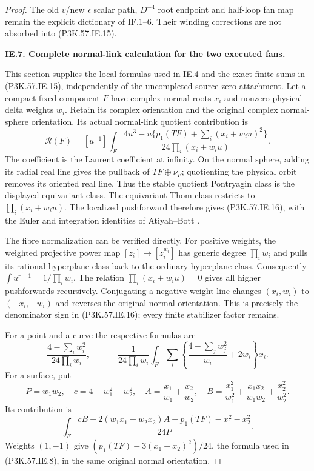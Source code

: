 \begin{proof}
The old
\(v\)/new \(\epsilon\) scalar path,
\(D^{-4}\) root endpoint and
half-loop fan map remain the explicit
dictionary of IF.1--6. Their winding
corrections are not absorbed into
(P3K.57.IE.15).

\par\medskip\noindent\textbf{IE.7. Complete normal-link calculation for the two executed fans.}\par\nopagebreak[4]

This section supplies the local formulas used in IE.4 and
the exact finite sums in (P3K.57.IE.15), independently of the
uncompleted source-zero attachment. Let a compact fixed
component \(F\) have complex normal roots \(x_i\) and
nonzero physical delta weights \(w_i\). Retain its complex
orientation and the original complex normal-sphere
orientation. Its actual normal-link quotient contribution is
\[
 \mathcal R(F)=[u^{-1}]\int_F
 \frac{4u^3-u\{p_1(TF)+\sum_i(x_i+w_i u)^2\}}
      {24\prod_i(x_i+w_i u)}.                         \tag{P3K.57.IE.16}
\]
The coefficient is the Laurent coefficient at infinity.
On the normal sphere, adding its radial real line gives
the pullback of \(TF\oplus\nu_F\); quotienting the
physical orbit removes its oriented real line. Thus the
stable quotient Pontryagin class is the displayed
equivariant class. The equivariant Thom class restricts
to \(\prod_i(x_i+w_i u)\). The localized pushforward
therefore gives (P3K.57.IE.16), with the Euler and integration
identities of Atiyah--Bott \cite[pp.~8--9, Theorem~(3.5), equations~(3.7)--(3.8)]{AtiyahBott1984}.

The fibre normalization can be verified directly. For
positive weights, the weighted projective power map
\([z_i]\mapsto[z_i^{w_i}]\) has generic degree
\(\prod_iw_i\) and pulls its rational hyperplane class
back to the ordinary hyperplane class. Consequently
\(\int u^{r-1}=1/\prod_iw_i\). The relation
\(\prod_i(x_i+w_i u)=0\) gives all higher pushforwards
recursively. Conjugating a negative-weight line changes
\((x_i,w_i)\) to \((-x_i,-w_i)\) and reverses the
original normal orientation. This is precisely the
denominator sign in (P3K.57.IE.16); every finite stabilizer
factor remains.

For a point and a curve the respective formulas are
\[
 \frac{4-\sum_iw_i^2}{24\prod_iw_i},\qquad
 -\frac1{24\prod_iw_i}\int_F\sum_i
 \left\{\frac{4-\sum_jw_j^2}{w_i}+2w_i\right\}x_i.
                                                               \tag{P3K.57.IE.17}
\]
For a surface, put
\[
 P=w_1w_2,\quad c=4-w_1^2-w_2^2,\quad
 A=\frac{x_1}{w_1}+\frac{x_2}{w_2},\quad
 B=\frac{x_1^2}{w_1^2}+\frac{x_1x_2}{w_1w_2}
                         +\frac{x_2^2}{w_2^2}.
\]
Its contribution is
\[
 \int_F\frac{cB+2(w_1x_1+w_2x_2)A
                 -p_1(TF)-x_1^2-x_2^2}{24P}.             \tag{P3K.57.IE.18}
\]
Weights \((1,-1)\) give
\((p_1(TF)-3(x_1-x_2)^2)/24\), the formula used
in (P3K.57.IE.8), in the same original normal orientation.


\end{proof}
